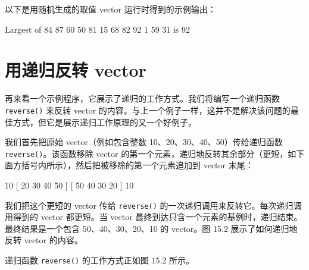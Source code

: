 以下是用随机生成的取值 vector 运行时得到的示例输出：

\begin{codebox}
Largest of 84 87 60 50 81 15 68 82 92  1 59 31
is 92
\end{codebox}


\section{用递归反转 vector}

再来看一个示例程序，它展示了递归的工作方式。我们将编写一个递归函数 \texttt{reverse()} 来反转 vector 的内容。与上一个例子一样，这并不是解决该问题的最佳方式，但它是展示递归工作原理的又一个好例子。

我们首先把原始 vector（例如包含整数 10、20、30、40、50）传给递归函数 \texttt{reverse()}。该函数移除 vector 的第一个元素，递归地反转其余部分（更短，如下面方括号内所示），然后把被移除的第一个元素追加到 vector 末尾：

\begin{codebox}
10 [ 20 30 40 50 ]
   [ 50 40 30 20 ] 10
\end{codebox}

我们把这个更短的 vector 传给 \texttt{reverse()} 的一次递归调用来反转它。每次递归调用得到的 vector 都更短。当 vector 最终到达只含一个元素的基例时，递归结束。最终结果是一个包含 50、40、30、20、10 的 vector。图 15.2 展示了如何递归地反转 vector 的内容。


递归函数 \texttt{reverse()} 的工作方式正如图 15.2 所示。

